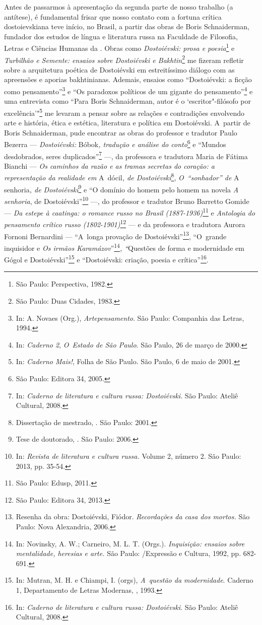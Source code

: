 Antes de passarmos à apresentação da segunda parte de nosso trabalho (a
antítese), é fundamental frisar que nosso contato com a fortuna crítica
dostoievskiana teve início, no Brasil, a partir das obras de Boris
Schnaiderman, fundador dos estudos de língua e literatura russa na
Faculdade de Filosofia, Letras e Ciências Humanas da . Obras como
\emph{Dostoiévski: prosa e poesia}\footnote{São Paulo: Perspectiva,
  1982.} e \emph{Turbilhão e Semente: ensaios sobre Dostoiévski e
Bakhtin}\footnote{São Paulo: Duas Cidades, 1983.} me fizeram refletir
sobre a arquitetura poética de Dostoiévski em estreitíssimo diálogo com
as apreensões e aporias bakhtinianas. Ademais, ensaios como
``Dostoiévski: a ficção como pensamento''\footnote{In: A. Novaes (Org.),
  \emph{Artepensamento}. São Paulo: Companhia das Letras, 1994.} e ``Os
paradoxos políticos de um gigante do pensamento''\footnote{In:
  \emph{Caderno 2}, \emph{O~Estado de São Paulo}. São Paulo, 26 de março
  de 2000.} e uma entrevista como ``Para Boris Schnaiderman, autor é o `escritor"-filósofo por excelência'"\footnote{In: \emph{Caderno Mais!}, Folha de São Paulo. São Paulo, 6 de maio de 2001.} me levaram a pensar
sobre as relações e contradições envolvendo arte e história, ética e
estética, literatura e política em Dostoiévski. A~partir de Boris
Schnaiderman, pude encontrar as obras do professor e tradutor Paulo
Bezerra --- \emph{Dostoiévski:} Bóbok\emph{, tradução e análise do
conto}\footnote{São Paulo: Editora 34, 2005.} e ``Mundos desdobrados,
seres duplicados''\footnote{In: \emph{Caderno de literatura e cultura
  russa: Dostoiévski}. São Paulo: Ateliê Cultural, 2008.} ---, da
professora e tradutora Maria de Fátima Bianchi --- \emph{Os caminhos da
razão e as tramas secretas do coração: a representação da realidade em} A~dócil\emph{, de Dostoiévski}\footnote{Dissertação de mestrado,
  . São Paulo: 2001.}, \emph{O~``sonhador'' de} A
senhoria\emph{, de Dostoiévski}\footnote{Tese de doutorado, .
  São Paulo: 2006.} e ``O domínio do homem pelo homem na novela \emph{A senhoria}, de Dostoiévski''\footnote{In: \emph{Revista de literatura e
  cultura russa.} Volume 2, número 2. São Paulo: 2013, pp. 35-54.} ---,
do professor e tradutor Bruno Barretto Gomide --- \emph{Da estepe à
caatinga: o romance russo no Brasil (1887-1936)}\footnote{São Paulo:
  Edusp, 2011.} e \emph{Antologia do pensamento crítico russo
(1802-1901)}\footnote{São Paulo: Editora 34, 2013.} --- e da professora e
tradutora Aurora Fornoni Bernardini --- ``A~longa provação de
Dostoiévski''\footnote{Resenha da obra: Dostoiévski, Fiódor.
  \emph{Recordações da casa dos mortos.} São Paulo: Nova Alexandria,
  2006.}, ``O~grande inquisidor e \emph{Os irmãos Karamázov}''\footnote{In:
  Novinsky, A. W.; Carneiro, M. L. T. (Orgs.). \emph{Inquisição: ensaios
  sobre mentalidade, heresias e arte.} São Paulo: /Expressão e
  Cultura, 1992, pp. 682-691.}\emph{, ``}Questões de forma e modernidade
em Gógol e Dostoiévski''\footnote{In: Mutran, M. H. e Chiampi, I. (orgs), \emph{A~questão da modernidade}. Caderno 1, Departamento de Letras Modernas, , 1993.} e ``Dostoiévski: criação, poesia e crítica''\footnote{In: \emph{Caderno de literatura e cultura russa:
  Dostoiévski}. São Paulo: Ateliê Cultural, 2008.}.

